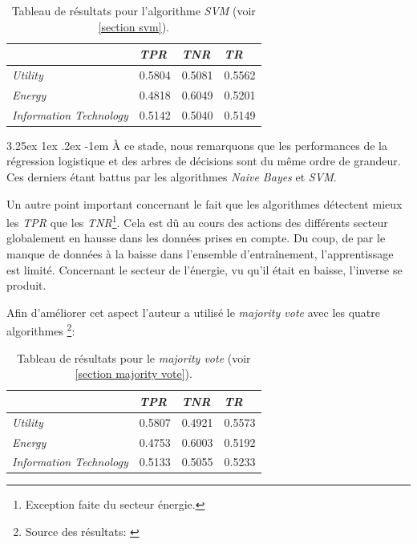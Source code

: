 \documentclass[a4paper, 11pt]{article}
\makeatletter
\renewcommand\paragraph{\@startsection{paragraph}{5}{\z@}%
  {3.25ex \@plus1ex \@minus.2ex}%
  {-1em}%
  {\normalfont\normalsize\bfseries}}
\makeatother
\begin{document}
\begin{table}[H]
	\centering
\begin{tabular}{|l|l|l|l|}
	\hline
	\ & \textit{TPR} & \textit{TNR} & \textit{TR}\\
	\hline
	\textit{Utility} & 0.5804 & 0.5081 & 0.5562 \\
	\hline
	\textit{Energy} & 0.4818 & 0.6049 & 0.5201\\
	\hline
	\textit{Information Technology} & 0.5142 & 0.5040 & 0.5149\\
	\hline
\end{tabular}
\caption{Tableau de résultats pour l'algorithme \textit{SVM} (voir \ref{section svm}).}
\end{table}


\paragraph{}
À ce stade, nous remarquons que les performances de la régression logistique et des arbres de décisions sont du même
ordre de grandeur. Ces derniers étant battus par les algorithmes \textit{Naive Bayes} et \textit{SVM}.

Un autre point important concernant le fait que les algorithmes détectent mieux les \textit{TPR} que les
\textit{TNR}\footnote{Exception faite du secteur énergie.}. Cela est dû au cours des actions des différents secteur
globalement en hausse dans les données prises en compte. Du coup, de par le manque de données à la baisse dans
l'ensemble d'entraînement, l'apprentissage est limité. Concernant le secteur de l'énergie, vu qu'il était en baisse,
l'inverse se produit.

Afin d'améliorer cet aspect l'auteur a utilisé le \textit{majority vote} avec les quatre algorithmes
\footnote{Source des résultats: \cite{machine_learning_automated_trading}}:

\begin{table}[h!]
	\centering
\begin{tabular}{|l|l|l|l|}
	\hline
	\ & \textit{TPR} & \textit{TNR} & \textit{TR}\\
	\hline
	\textit{Utility} & 0.5807 & 0.4921 & 0.5573 \\
	\hline
	\textit{Energy} & 0.4753 & 0.6003 & 0.5192\\
	\hline
	\textit{Information Technology} & 0.5133 & 0.5055 & 0.5233\\
	\hline
\end{tabular}
\caption{Tableau de résultats pour le \textit{majority vote} (voir \ref{section majority vote}).}
\end{table}
\end{document}
